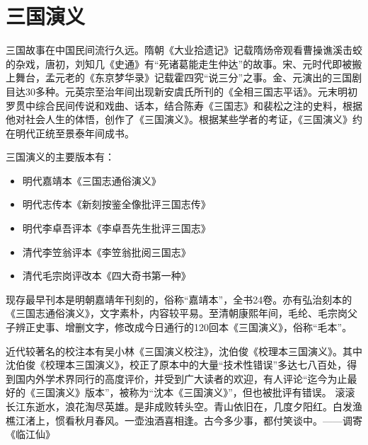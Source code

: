\chapter{三国演义}
    三国故事在中国民间流行久远。隋朝《大业拾遗记》记载隋炀帝观看曹操谯溪击蛟的杂戏，唐初，刘知几《史通》有“死诸葛能走生仲达”的故事。宋、元时代即被搬上舞台，孟元老的《东京梦华录》记载霍四究“说三分”之事。金、元演出的三国剧目达30多种。元英宗至治年间出现新安虞氏所刊的《全相三国志平话》。元末明初罗贯中综合民间传说和戏曲、话本，结合陈寿《三国志》和裴松之注的史料，根据他对社会人生的体悟，创作了《三国演义》。根据某些学者的考证，《三国演义》约在明代正统至景泰年间成书。

    三国演义的主要版本有：
    \begin{itemize}
        \item 明代嘉靖本《三国志通俗演义》
        \item 明代志传本《新刻按鉴全像批评三国志传》
        \item 明代李卓吾评本《李卓吾先生批评三国志》
        \item 清代李笠翁评本《李笠翁批阅三国志》
        \item 清代毛宗岗评改本《四大奇书第一种》
    \end{itemize}
    现存最早刊本是明朝嘉靖年刊刻的，俗称“嘉靖本”，全书24卷。亦有弘治刻本的《三国志通俗演义》，文字素朴，内容较平易。至清朝康熙年间，毛纶、毛宗岗父子辨正史事、增删文字，修改成今日通行的120回本《三国演义》，俗称“毛本”。

    近代较著名的校注本有吴小林《三国演义校注》，沈伯俊《校理本三国演义》。其中沈伯俊《校理本三国演义》，校正了原本中的大量“技术性错误”多达七八百处，得到国内外学术界同行的高度评价，并受到广大读者的欢迎，有人评论“迄今为止最好的《三国演义》版本”，被称为“沈本《三国演义》”，但也被批评有错误。
    滚滚长江东逝水，浪花淘尽英雄。是非成败转头空。青山依旧在，几度夕阳红。白发渔樵江渚上，惯看秋月春风。一壶浊酒喜相逢。古今多少事，都付笑谈中。——调寄《临江仙》
